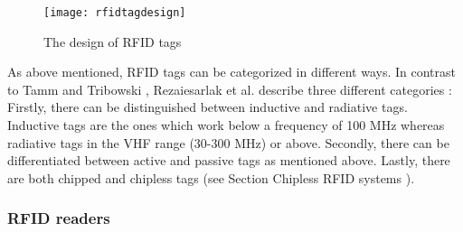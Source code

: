 \begin{figure}
\centering
\texttt{[image: rfidtagdesign]} 
\caption{\label{fig:tagdesign}The design of RFID tags  \cite[p.13]{chipless}} 
\end{figure}

As above mentioned, RFID tags can be categorized in different ways. In contrast to Tamm and Tribowski \pageref{classes}, Rezaiesarlak et al. \cite{chipless} describe three different categories \cite[p.9 ff.]{chipless}: Firstly, there can be distinguished between inductive and radiative tags. Inductive tags are the ones which work below a frequency of 100 MHz whereas radiative tags in the \ac{VHF} range (30-300 MHz) or above. Secondly, there can be differentiated between active and passive tags as mentioned above. Lastly, there are both chipped and chipless tags (see Section Chipless RFID systems \pageref{chipless}). 

\subsubsection{RFID readers} \label{reader}

